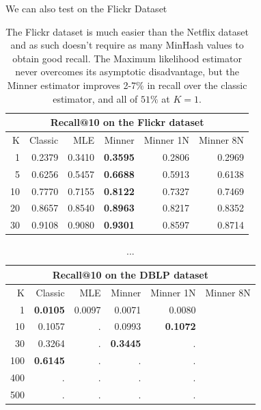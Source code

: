 We can also test on the Flickr Dataset
\begin{table}
\centering
 \begin{tabular}{|r| r r r r r|} 
 \hline
     \multicolumn{6}{|c|}{Recall@10 on the Flickr dataset} \\
 \hline
 K  & Classic & MLE & Minner & Minner 1N & Minner 8N \\
 \hline
    1 & 0.2379 & 0.3410 & \textbf{ 0.3595} & 0.2806 & 0.2969 \\
   5 & 0.6256 & 0.5457 & \textbf{ 0.6688} & 0.5913 & 0.6138 \\
  10 & 0.7770 & 0.7155 & \textbf{ 0.8122} & 0.7327 & 0.7469 \\
  20 & 0.8657 & 0.8540 & \textbf{ 0.8963} & 0.8217 & 0.8352 \\
  30 & 0.9108 & 0.9080 & \textbf{ 0.9301} & 0.8597 & 0.8714 \\
  \hline
 \end{tabular}
 \caption{The Flickr dataset is much easier than the Netflix dataset and as such doesn't require as many MinHash values to obtain good recall. The Maximum likelihood estimator never overcomes its asymptotic disadvantage, but the Minner estimator improves 2-7\% in recall over the classic estimator, and all of $51\%$ at $K=1$.}
 \label{tab:flickr}
\end{table}


\begin{table}
\centering
 \begin{tabular}{|r| r r r r r|} 
 \hline
     \multicolumn{6}{|c|}{Recall@10 on the DBLP dataset} \\
 \hline
 K  & Classic & MLE & Minner & Minner 1N & Minner 8N \\
 \hline
    1 & \textbf{ 0.0105} & 0.0097 & 0.0071 & 0.0080 \\
  10 & 0.1057 &      . & 0.0993 & \textbf{ 0.1072} \\
  30 & 0.3264 &      . & \textbf{ 0.3445} &      . \\
 100 & \textbf{ 0.6145} &      . &      . &      . \\
 400 &      . &      . &      . &      . \\
 500 &      . &      . &      . &      . \\
  \hline
 \end{tabular}
 \caption{...}
 \label{tab:dblp}
\end{table}


